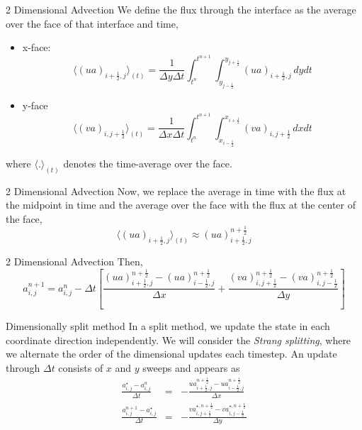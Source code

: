 \documentclass[11pt]{beamer}
\begin{document}
\begin{frame}[fragile]{2 Dimensional Advection}
We define the flux through the interface as the average over the face
of that interface and time, 
\begin{itemize}
\item x-face:
\begin{equation}
\langle (ua)_{i+\frac{1}{2},j}\rangle_{(t)} = \frac{1}{\Delta y \Delta t}
    \int_{t^n}^{t^{n+1}} \int_{y_{j-\frac{1}{2}}}^{y_{j+\frac{1}{2}}} (ua)_{i+\frac{1}{2},j}\, dy dt
\end{equation}
\item y-face
\begin{equation}
\langle (va)_{i,j+\frac{1}{2}}\rangle_{(t)} = \frac{1}{\Delta x \Delta t}
    \int_{t^n}^{t^{n+1}} \int_{x_{i-\frac{1}{2}}}^{x_{i+\frac{1}{2}}} (va)_{i,j+\frac{1}{2}}\, dx dt 
\end{equation}
\end{itemize}
where $\langle . \rangle_{(t)}$ denotes the time-average over the face.
\end{frame}

\begin{frame}[fragile]{2 Dimensional Advection}
Now, we replace the average in
time with the flux at the midpoint in time and the average over the face
with the flux at the center of the face,
\begin{equation}
\langle (ua)_{i+\frac{1}{2},j} \rangle_{(t)} \approx (ua)_{i+\frac{1}{2},j}^{n+\frac{1}{2}}
\end{equation}
\end{frame}

\begin{frame}[fragile]{2 Dimensional Advection}
Then, 
\begin{equation}
a_{i,j}^{n+1} = a_{i,j}^n - \Delta t \left [
   \frac{(ua)_{i+\frac{1}{2},j}^{n+\frac{1}{2}} - (ua)_{i-\frac{1}{2},j}^{n+\frac{1}{2}}}{\Delta x} +
   \frac{(va)_{i,j+\frac{1}{2}}^{n+\frac{1}{2}} - (va)_{i,j-\frac{1}{2}}^{n+\frac{1}{2}}}{\Delta y} \right ]
\end{equation}
\end{frame}

\begin{frame}[fragile]{Dimensionally split method}
In a split method, we update the state in each coordinate direction
independently.  We will consider the {\em Strang splitting}, where we alternate
the order of the dimensional updates each timestep.  An update through
$\Delta t$ consists of $x$ and $y$ sweeps and appears as
\begin{eqnarray}
 \frac{a_{i,j}^\star - a_{i,j}^n}{\Delta t} &=&
  - \frac{ u a_{i+\frac{1}{2},j}^{n+\frac{1}{2}} - u a_{i-\frac{1}{2},j}^{n+\frac{1}{2}} }{\Delta x} \label{eq:splitx}\\
 \frac{a_{i,j}^{n+1} - a_{i,j}^\star}{\Delta t} &=&
  - \frac{ v a_{i,j+\frac{1}{2}}^{\star,n+\frac{1}{2}} - v a_{i,j-\frac{1}{2}}^{\star,n+\frac{1}{2}} }{\Delta y} \label{eq:splity}
\end{eqnarray}
\end{frame}
\end{document}
